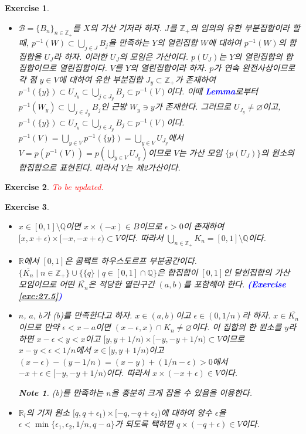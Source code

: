 \documentclass{article}
\newtheorem{exercise}{Exercise}[section]
\newtheorem*{note}{Note}
\newcommand{\Q}{\mathbb{Q}}
\newcommand{\R}{\mathbb{R}}
\newcommand{\Z}{\mathbb{Z}}
\begin{document}
\begin{exercise}
\begin{itemize}
        \item[(d)] $\mathcal{B}=\{B_n\}_{n\in\Z_+}$를 $X$의 가산 기저라 하자. $J$를 $\Z_+$의 임의의 유한 부분집합이라 할 때,  $p^{-1}(W)\subset\bigcup_{j\in J}B_j$을 만족하는 $Y$의 열린집합 $W$에 대하여 $p^{-1}(W)$의 합집합을 $U_J$라 하자. 이러한 $U_J$의 모임은 가산이다. $p(U_J)$는 $Y$의 열린집합의 합집합이므로 열린집합이다. $V$를 $Y$의 열린집합이라 하자. $p$가 연속 완전사상이므로 각 점 $y\in V$에 대하여 유한 부분집합 $J_y\subset\Z_+$가 존재하여 $p^{-1}(\{y\})\subset U_{J_y}\subset\bigcup_{j\in J_y}B_j\subset p^{-1}(V)$이다. 이때 \textcolor{blue}{\textbf{Lemma}}로부터 $p^{-1}(W_y)\subset\bigcup_{j\in J_y}B_j$인 근방 $W_y\ni y$가 존재한다. 그러므로 $U_{J_y}\ne\varnothing$이고, $p^{-1}(\{y\})\subset U_{J_y}\subset\bigcup_{j\in J_y}B_j\subset p^{-1}(V)$이다. $p^{-1}(V)=\bigcup_{y\in V}p^{-1}(\{y\})=\bigcup_{y\in V}U_{J_y}$에서 $V=p(p^{-1}(V))=p(\bigcup_{y\in V}U_{J_y})$이므로 $V$는 가산 모임 $\{p(U_J)\}$의 원소의 합집합으로 표현된다. 따라서 $Y$는 제2가산이다.
    \end{itemize}
\end{exercise}

\begin{exercise}
    \textcolor{red}{To be updated.}
\end{exercise}

\begin{exercise}
    \phantom{}
    \begin{itemize}
        \item[(a)] $x\in[0,1]\setminus\Q$이면 $x\times(-x)\in B$이므로 $\epsilon>0$이 존재하여 $[x,x+\epsilon)\times[-x,-x+\epsilon)\subset V$이다. 따라서 $\bigcup_{n\in\Z_+}K_n=[0,1]\setminus\Q$이다.
        \item[(b)] $\R$에서 $[0,1]$은 콤팩트 하우스도르프 부분공간이다. $\{\overline{K_n}\mid n\in\Z_+\}\cup\{\{q\}\mid q\in[0,1]\cap\Q\}$은 합집합이 $[0,1]$인 닫힌집합의 가산 모임이므로 어떤 $\overline{K_n}$은 적당한 열린구간 $(a,b)$를 포함해야 한다. \textcolor{blue}{\textbf{(Exercise \ref{exc:27.5})}}
        \item[(c)] $n$, $a$, $b$가 (b)를 만족한다고 하자. $x\in(a,b)$이고 $\epsilon\in(0,1/n)$라 하자. $x\in\overline{K_n}$이므로 만약 $\epsilon<x-a$이면 $(x-\epsilon,x)\cap K_n\ne\varnothing$이다. 이 집합의 한 원소를 $y$라 하면 $x-\epsilon<y<x$이고 $[y,y+1/n)\times[-y,-y+1/n)\subset V$이므로 $x-y<\epsilon<1/n$에서 $x\in[y,y+1/n)$이고 $(x-\epsilon)-(y-1/n)=(x-y)+(1/n-\epsilon)>0$에서 $-x+\epsilon\in[-y,-y+1/n)$이다. 따라서 $x\times(-x+\epsilon)\in V$이다.
        \begin{note}
            (b)를 만족하는 $n$을 충분히 크게 잡을 수 있음을 이용한다.
        \end{note}
        \item[(d)] $\R_l$의 기저 원소 $[q,q+\epsilon_1)\times[-q,-q+\epsilon_2)$에 대하여 양수 $\epsilon$을 $\epsilon<\min\{\epsilon_1,\epsilon_2,1/n,q-a\}$가 되도록 택하면 $q\times(-q+\epsilon)\in V$이다.
    \end{itemize}
\end{exercise}
\end{document}
